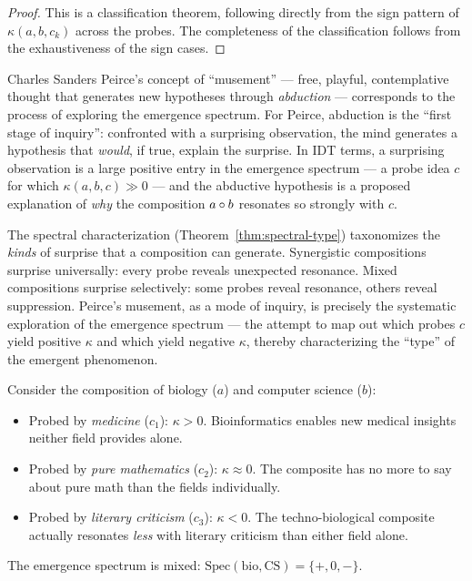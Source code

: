 \begin{proof}
This is a classification theorem, following directly from the sign pattern of
$\kappa(a, b, c_k)$ across the probes.  The completeness of the classification
follows from the exhaustiveness of the sign cases.
\end{proof}

\begin{interpretation}
\label{interp:ch19:peirce_musement}
Charles Sanders Peirce's concept of ``musement'' --- free, playful,
contemplative thought that generates new hypotheses through
\emph{abduction} --- corresponds to the process of exploring the emergence
spectrum.  For Peirce, abduction is the ``first stage of inquiry'':
confronted with a surprising observation, the mind generates a hypothesis
that \emph{would}, if true, explain the surprise.  In IDT terms, a
surprising observation is a large positive entry in the emergence spectrum
--- a probe idea $c$ for which $\kappa(a, b, c) \gg 0$ --- and the
abductive hypothesis is a proposed explanation of \emph{why} the
composition $a \circ b$ resonates so strongly with $c$.

The spectral characterization (Theorem~\ref{thm:spectral-type}) taxonomizes
the \emph{kinds} of surprise that a composition can generate.  Synergistic
compositions surprise universally: every probe reveals unexpected
resonance.  Mixed compositions surprise selectively: some probes reveal
resonance, others reveal suppression.  Peirce's musement, as a mode of
inquiry, is precisely the systematic exploration of the emergence spectrum
--- the attempt to map out which probes $c$ yield positive $\kappa$ and
which yield negative $\kappa$, thereby characterizing the ``type'' of the
emergent phenomenon.
\end{interpretation}

\begin{example}
Consider the composition of biology ($a$) and computer science ($b$):
\begin{itemize}
\item Probed by \emph{medicine} ($c_1$): $\kappa > 0$.  Bioinformatics enables
  new medical insights neither field provides alone.
\item Probed by \emph{pure mathematics} ($c_2$): $\kappa \approx 0$.  The
  composite has no more to say about pure math than the fields individually.
\item Probed by \emph{literary criticism} ($c_3$): $\kappa < 0$.  The
  techno-biological composite actually resonates \emph{less} with literary
  criticism than either field alone.
\end{itemize}
The emergence spectrum is mixed: $\mathrm{Spec}(\text{bio}, \text{CS}) =
\{+, 0, -\}$.
\end{example}

